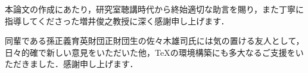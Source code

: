 \begin{acknowledgment}

本論文の作成にあたり，研究室聴講時代から終始適切な助言を賜り，また丁寧に指導してくださった増井俊之教授に深く感謝申し上げます．

同輩である孫正義育英財団正財団生の佐々木雄司氏には気の置ける友人として，日々的確で新しい意見をいただいた他，TeXの環境構築にも多大なるご支援をいただきました．感謝申し上げます．

\end{acknowledgment}
